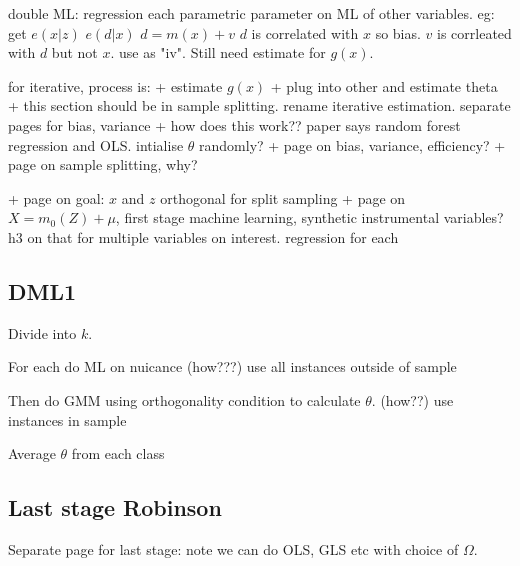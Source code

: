 double ML: regression each parametric parameter on ML of other variables.
eg: get \(e(x|z)\)
\(e(d|x)\)
\(d=m(x)+v\)
\(d\) is correlated with \(x\) so bias.
\(v\) is corrleated with \(d\) but not \(x\). use as "iv".
Still need estimate for \(g(x)\).

for iterative, process is:
+ estimate \(g(x)\)
+ plug into other and estimate theta
+ this section should be in sample splitting. rename iterative estimation. separate pages for bias, variance
+ how does this work?? paper says random forest regression and OLS. intialise \(\theta \) randomly?
+ page on bias, variance, efficiency?
+ page on sample splitting, why?

+ page on goal: \(x\) and \(z\) orthogonal for split sampling
+ page on \(X=m_0(Z)+\mu\), first stage machine learning, synthetic instrumental variables? h3 on that for multiple variables on interest. regression for each

\subsection{DML1}
Divide into \(k\).

For each do ML on nuicance (how???) use all instances outside of sample

Then do GMM using orthogonality condition to calculate \(\theta \). (how??) use instances in sample

Average \(\theta \) from each class


\subsection{Last stage Robinson}

Separate page for last stage: note we can do OLS, GLS etc with choice of \(\Omega \).



